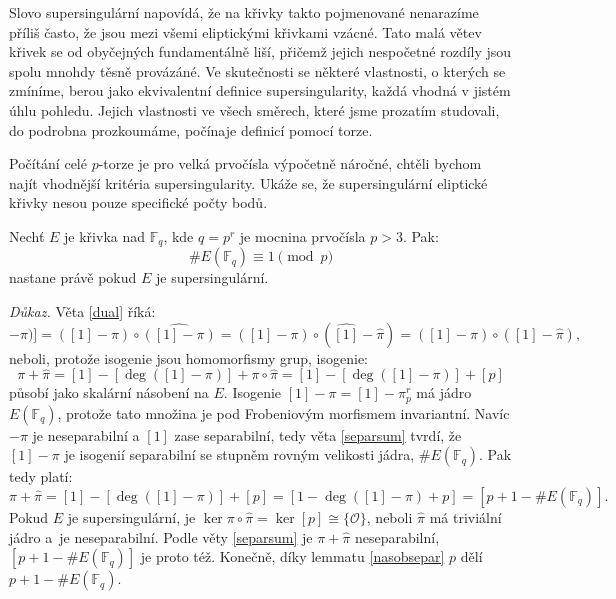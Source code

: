 \documentclass[12pt]{report}
\begin{document}
Slovo supersingulární napovídá, že na křivky takto pojmenované nenarazíme příliš často, že jsou mezi všemi eliptickými křivkami vzácné. Tato malá větev křivek se od obyčejných fundamentálně liší, přičemž jejich nespočetné rozdíly jsou spolu mnohdy těsně provázáné. Ve skutečnosti se některé vlastnosti, o kterých se zmíníme, berou jako ekvivalentní definice supersingularity, každá vhodná v jistém úhlu pohledu. Jejich vlastnosti ve všech směrech, které jsme prozatím studovali, do podrobna prozkoumáme, počínaje definicí pomocí torze.

Počítání celé $p$-torze je pro velká prvočísla výpočetně náročné, chtěli bychom najít vhodnější kritéria supersingularity. Ukáže se, že supersingulární eliptické křivky nesou pouze specifické počty bodů.

\begin{veta}\label{super}
Nechť $E$ je křivka nad $\mathbb{F}_q$, kde $q = p^r$ je mocnina prvočísla $p > 3$. Pak: $$\# E(\mathbb{F}_q) \equiv 1 \pmod{p}$$ nastane právě pokud $E$ je supersingulární.
\end{veta}

\noindent \textit{Důkaz.} Věta \ref{dual} říká:
\begin{equation*}
[\deg([1]-\pi)] = ([1]-\pi) \circ \widehat{([1]-\pi)} = ([1]-\pi) \circ (\widehat{[1]}-\widehat{\pi}) = ([1]-\pi) \circ ([1]-\widehat{\pi}),
\end{equation*} 
neboli, protože isogenie jsou homomorfismy grup, isogenie:
\begin{equation*}
\pi+\widehat{\pi} = [1] - [\deg([1]-\pi)]+\pi \circ \widehat{\pi} = [1]-[\deg([1]-\pi)]+[p]
\end{equation*}
působí jako skalární násobení na $E$. Isogenie $[1]-\pi = [1] - \pi_p ^r$ má jádro $E(\mathbb{F}_q)$, protože tato množina je pod Frobeniovým morfismem invariantní. Navíc $-\pi$ je neseparabilní a $[1]$ zase separabilní, tedy věta \ref{separsum} tvrdí, že $[1]-\pi$ je isogenií separabilní se stupněm rovným velikosti jádra, $\#E(\mathbb{F}_q)$. Pak tedy platí:
\begin{equation*}
\pi+\widehat{\pi}  = [1]-[\deg([1]-\pi)]+[p] = [1-\deg ([1]-\pi)+p] =  [p+1-\#E(\mathbb{F}_q)].
\end{equation*}
Pokud $E$ je supersingulární, je $\ker \pi \circ \widehat{\pi} = \ker [p] \cong \lbrace \mathcal{O} \rbrace$, neboli $\widehat{\pi}$ má triviální jádro a~je neseparabilní. Podle věty \ref{separsum} je $\pi+\widehat{\pi}$ neseparabilní, $[p+1-\#E(\mathbb{F}_q)]$ je proto též.  Konečně, díky lemmatu \ref{nasobsepar} $p$ dělí $p+1-\#E(\mathbb{F}_q)$.
\end{document}
